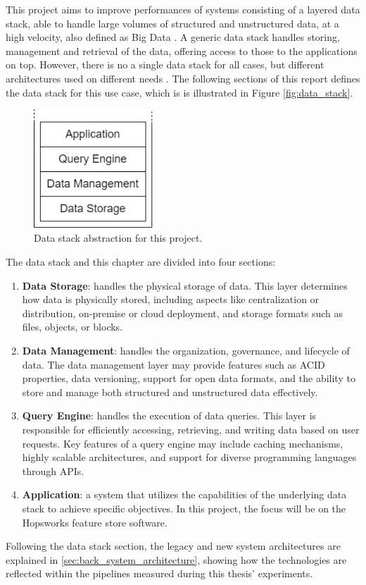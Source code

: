 This project aims to improve performances of systems consisting of a layered data stack, able to handle large volumes of structured and unstructured data, at a high velocity, also defined as Big Data \cite{PDFBigData2024}. 
A generic data stack handles storing, management and retrieval of the data, offering access to those to the applications on top. However, there is no a single data stack for all cases, but different architectures used on different needs \cite{framptonCompleteGuideOpen2018,sakrBigDataProcessing2017,IcebergExamples2024}. The following sections of this report defines the data stack for this use case, which is is illustrated in Figure \ref{fig:data_stack}.

\begin{figure}[!ht]
    \begin{center}
      \includegraphics[width=0.4\textwidth]{figures/2-background_and_related_work/datastack.png}
    \end{center}
    \caption[Data stack abstraction]{Data stack abstraction for this project.}
    \label{fig:datastack}
\end{figure}

The data stack and this chapter are divided into four sections:
\begin{enumerate}
    \item \textbf{Data Storage}: handles the physical storage of data. This layer determines how data is physically stored, including aspects like centralization or distribution, on-premise or cloud deployment, and storage formats such as files, objects, or blocks.
    \item \textbf{Data Management}: handles the organization, governance, and lifecycle of data. The data management layer may provide features such as \gls{ACID} properties, data versioning, support for open data formats, and the ability to store and manage both structured and unstructured data effectively.
    \item \textbf{Query Engine}: handles the execution of data queries. This layer is responsible for efficiently accessing, retrieving, and writing data based on user requests. Key features of a query engine may include caching mechanisms, highly scalable architectures, and support for diverse programming languages through \glspl{API}.
    \item \textbf{Application}: a system that utilizes the capabilities of the underlying data stack to achieve specific objectives. In this project, the focus will be on the Hopsworks feature store software.
\end{enumerate}

Following the data stack section, the legacy and new system architectures are explained in \autoref{sec:back_system_architecture}, showing how the technologies are reflected within the pipelines measured during this thesis' experiments.